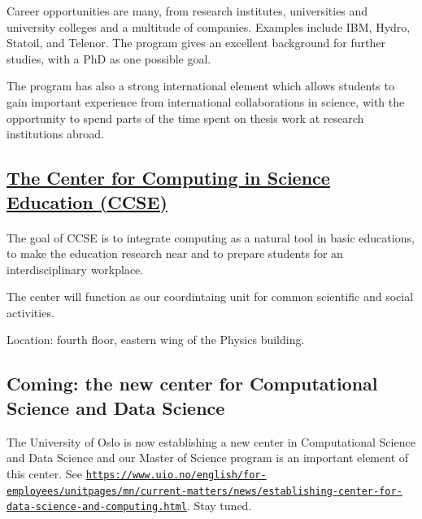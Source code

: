 \documentclass[%
oneside,                 %
final,                   %
10pt]{article}
\begin{document}
Career opportunities are many, from research institutes, universities
and university colleges and a multitude of companies. Examples
include IBM, Hydro, Statoil, and Telenor.  The program gives an
excellent background for further studies, with a PhD as one possible
goal.

The program has also a strong international element which allows students to
gain important experience from international collaborations in
science, with the opportunity to spend parts of the time spent on
thesis work at research institutions abroad.






\subsection{\href{{https://www.mn.uio.no/ccse/english/}}{The Center for Computing in Science Education (CCSE)}}


\paragraph{}
The goal of CCSE is to integrate computing as a natural tool in basic educations, to make the education research near and to prepare students for an interdisciplinary workplace.

The center will function as our coordintaing unit for common scientific and social activities. 

Location: fourth floor, eastern wing of the Physics building.

 



\subsection{Coming: the new center for Computational Science and Data Science}

The University of Oslo is now establishing a new center in Computational Science and Data Science and our Master of Science program is an important element of this center. See
\href{{https://www.uio.no/english/for-employees/unitpages/mn/current-matters/news/establishing-center-for-data-science-and-computing.html}}{\nolinkurl{https://www.uio.no/english/for-employees/unitpages/mn/current-matters/news/establishing-center-for-data-science-and-computing.html}}. Stay tuned.



\end{document}
